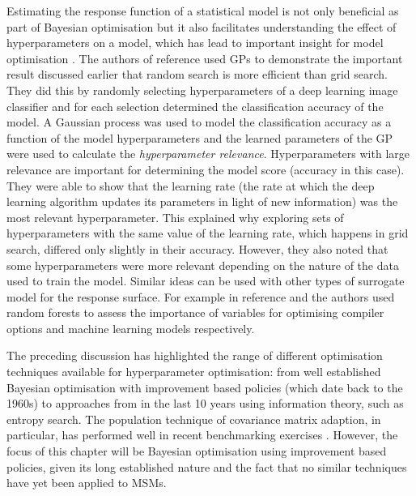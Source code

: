Estimating the response function of a statistical model is not only beneficial as part of Bayesian optimisation but it also facilitates understanding the effect of hyperparameters on  a model, which has lead to important insight for model optimisation \cite{rasmussenGaussianProcessesMachine2006}. The authors of reference \cite{bergstrajamesbergstraRandomSearchHyperParameter2012} used GPs to demonstrate the important result discussed earlier that random search is more efficient than grid search. They did this by randomly selecting hyperparameters of a deep learning image classifier and for each selection determined the classification accuracy of the model. A Gaussian process was used to model the classification accuracy as a function of the model hyperparameters and the learned parameters of the GP were used to calculate the \emph{hyperparameter relevance}.  Hyperparameters with large relevance are important for determining the model score (accuracy in this case). They were able to show that the learning rate (the rate at which the deep learning algorithm updates its parameters in light of new information) was the most relevant hyperparameter. This explained why exploring sets of hyperparameters with the same value of the learning rate, which happens in grid search, differed only slightly in their accuracy. However, they also noted that some hyperparameters were more relevant depending on the nature of the data used to train the model. Similar ideas can be used with other types of surrogate model for the response surface. For example in  reference \cite{gramacyVariableSelectionSensitivity2013} and \cite{pmlr-v32-hutter14} the authors used  random forests to assess the importance of variables for optimising compiler options and machine learning models respectively. 

The preceding discussion has highlighted the range of different optimisation techniques available for hyperparameter optimisation: from well established Bayesian optimisation with improvement based policies (which date back to the 1960s) to approaches from in the last 10 years using information theory, such as entropy search. The population technique of covariance matrix adaption, in particular, has performed well in recent benchmarking exercises \cite{dufosse2019benchmarking,faury2019benchmarking,bodner2019benchmarking}. However, the focus of this chapter will be Bayesian optimisation using improvement based policies, given its long established nature and the fact that no similar techniques have yet been applied to MSMs.  

